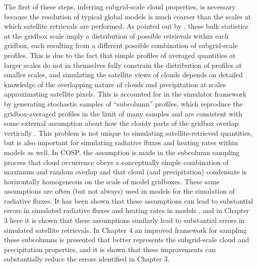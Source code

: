 The first of these steps, inferring subgrid-scale cloud properties, is
necessary because the resolution of typical global models is much
coarser than the scales at which satellite retrievals are performed. As
pointed out by \citet{pincus_et_al_2012}, these bulk statistics at the
gridbox scale imply a distribution of possible retrievals within each
gridbox, each resulting from a different possible combination of
subgrid-scale profiles. This is due to the fact that simple profiles of
averaged quantities at larger scales do not in themselves fully
constrain the distribution of profiles at smaller scales, and simulating
the satellite views of clouds depends on detailed knowledge of the
overlapping nature of clouds and precipitation at scales approximating
satellite pixels. This is accounted for in the simulator framework by
generating stochastic samples of ``subcolumn'' profiles, which reproduce
the gridbox-averaged profiles in the limit of many samples and are
consistent with some external assumption about how the cloudy parts of
the gridbox overlap vertically \citep{klein_and_jakob_1999}. This
problem is not unique to simulating satellite-retrieved quantities, but
is also important for simulating radiative fluxes and heating rates
within models as well. In COSP, the assumption is made in the subcolumn
sampling process that cloud occurrence obeys a conceptually simple
combination of maximum and random overlap and that cloud (and
precipitation) condensate is horizontally homogeneous on the scale of
model gridboxes. These same assumptions are often (but not always) used
in models for the simulation of radiative fluxes. It has been shown that
these assumptions can lead to substantial errors in simulated radiative
fluxes and heating rates in models
\citep{barker_et_al_1999, oreopoulos_et_al_2012}, and in Chapter 3 here
it is shown that these assumptions similarly lead to substantial errors
in simulated satellite retrievals. In Chapter 4 an improved framework
for sampling these subcolumns is presented that better represents the
subgrid-scale cloud and precipitation properties, and it is shown that
these improvements can substantially reduce the errors identified in
Chapter 3.

